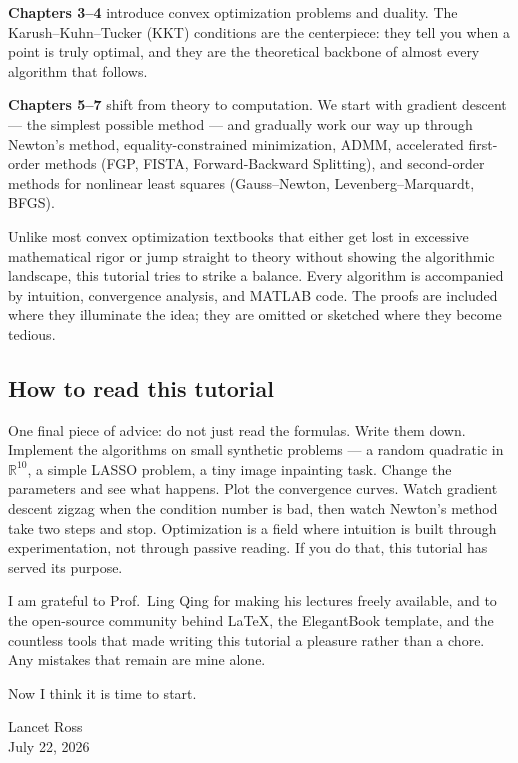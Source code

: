 \documentclass[lang=en,color=blue,mode=fancy,titlestyle=hang]{elegantbook}
\begin{document}
\textbf{Chapters 3–4} introduce convex optimization problems and duality. The Karush–Kuhn–Tucker
(KKT) conditions are the centerpiece: they tell you when a point is truly optimal, and they
are the theoretical backbone of almost every algorithm that follows.

\textbf{Chapters 5–7} shift from theory to computation. We start with gradient descent —
the simplest possible method — and gradually work our way up through Newton's method,
equality-constrained minimization, ADMM, accelerated first-order methods (FGP, FISTA,
Forward-Backward Splitting), and second-order methods for nonlinear least squares
(Gauss–Newton, Levenberg–Marquardt, BFGS).

Unlike most convex optimization textbooks that either get lost in excessive mathematical rigor
or jump straight to theory without showing the algorithmic landscape, this tutorial tries to strike
a balance. Every algorithm is accompanied by intuition, convergence analysis, and MATLAB
code. The proofs are included where they illuminate the idea; they are omitted or sketched
where they become tedious.

\subsection*{How to read this tutorial}

One final piece of advice: do not just read the formulas. Write them down. Implement the
algorithms on small synthetic problems — a random quadratic in $\mathbb{R}^{10}$, a simple
LASSO problem, a tiny image inpainting task. Change the parameters and see what happens.
Plot the convergence curves. Watch gradient descent zigzag when the condition number is bad,
then watch Newton's method take two steps and stop. Optimization is a field where intuition
is built through experimentation, not through passive reading. If you do that, this tutorial has
served its purpose.

I am grateful to Prof.\ Ling Qing for making his lectures freely available, and to the open-source
community behind \LaTeX, the ElegantBook template, and the countless tools that made writing
this tutorial a pleasure rather than a chore. Any mistakes that remain are mine alone.

Now I think it is time to start.

\begin{flushright}
  Lancet Ross\\
  July 22, 2026
\end{flushright}
\end{document}

